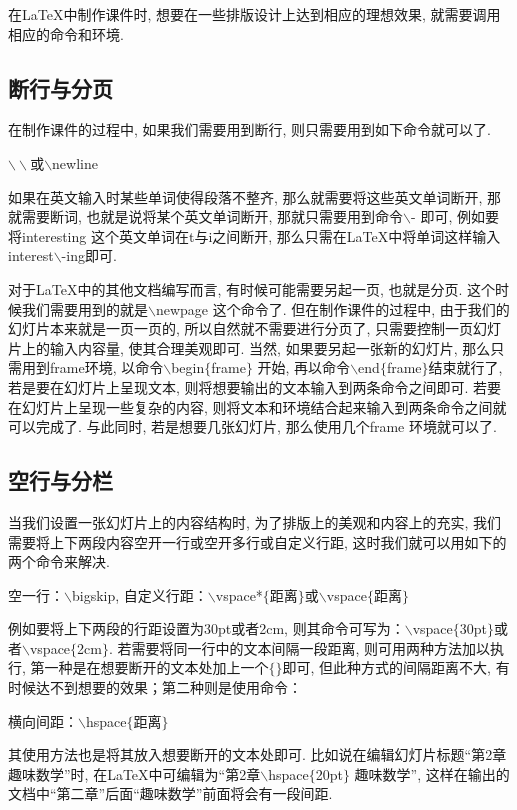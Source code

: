 在\LaTeX{}中制作课件时, 想要在一些排版设计上达到相应的理想效果, 就需要调用相应的命令和环境.
\subsection{断行与分页}

在制作课件的过程中, 如果我们需要用到断行, 则只需要用到如下命令就可以了.
\\ \centerline{
$\backslash\backslash$或$\backslash$newline}
如果在英文输入时某些单词使得段落不整齐, 那么就需要将这些英文单词断开, 那就需要断词, 也就是说将某个英文单词断开, 那就只需要用到命令$\backslash$- 即可, 例如要将interesting 这个英文单词在t与i之间断开, 那么只需在\LaTeX{}中将单词这样输入interest$\backslash$-ing即可.

对于\LaTeX{}中的其他文档编写而言, 有时候可能需要另起一页, 也就是分页. 这个时候我们需要用到的就是$\backslash$newpage 这个命令了. 但在制作课件的过程中, 由于我们的幻灯片本来就是一页一页的, 所以自然就不需要进行分页了, 只需要控制一页幻灯片上的输入内容量, 使其合理美观即可. 当然, 如果要另起一张新的幻灯片, 那么只需用到frame环境, 以命令$\backslash$begin$\{$frame$\}$ 开始, 再以命令$\backslash$end$\{$frame$\}$结束就行了, 若是要在幻灯片上呈现文本, 则将想要输出的文本输入到两条命令之间即可. 若要在幻灯片上呈现一些复杂的内容, 则将文本和环境结合起来输入到两条命令之间就可以完成了. 与此同时, 若是想要几张幻灯片, 那么使用几个frame 环境就可以了.
\subsection{空行与分栏}

当我们设置一张幻灯片上的内容结构时, 为了排版上的美观和内容上的充实, 我们需要将上下两段内容空开一行或空开多行或自定义行距, 这时我们就可以用如下的两个命令来解决.

\centerline{空一行：$\backslash$bigskip,\quad
自定义行距：$\backslash$vspace*$\{$距离$\}$或$\backslash$vspace$\{$距离$\}$}
例如要将上下两段的行距设置为30pt或者2cm, 则其命令可写为：$\backslash$vspace$\{$30pt$\}$或者$\backslash$vspace$\{$2cm$\}$.  若需要将同一行中的文本间隔一段距离, 则可用两种方法加以执行, 第一种是在想要断开的文本处加上一个$\{\}$即可, 但此种方式的间隔距离不大, 有时候达不到想要的效果；第二种则是使用命令：

\centerline{
横向间距：$\backslash$hspace$\{$距离$\}$}
其使用方法也是将其放入想要断开的文本处即可.  比如说在编辑幻灯片标题“第2章趣味数学”时, 在\LaTeX{}中可编辑为“第2章$\backslash$hspace$\{$20pt$\}$ 趣味数学”, 这样在输出的文档中“第二章”后面“趣味数学”前面将会有一段间距.


